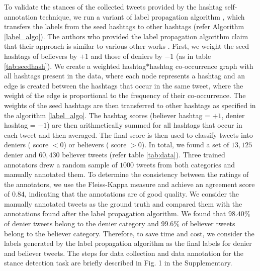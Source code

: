 \documentclass[letterpaper]{article} %
\begin{document}
To validate the stances of the collected tweets provided by the hashtag self-annotation technique, we run a variant of label propagation algorithm \cite{tyagi2020polarizing,tyagi2020computational}, which transfers the labels from the seed hashtags to other hashtags (refer Algorithm \ref{label_algo}). The authors who provided the label propagation algorithm claim that their approach is similar to various other works \cite{weber2013secular,garimella2018quantifying}. First, we weight the seed hashtags of believers by $+1$ and those of deniers by $-1$ (as in table \ref{tab:seedhash}). We create a weighted hashtag$*$hashtag co-occurrence graph with all hashtags present in the data, where each node represents a hashtag and an edge is created between the hashtags that occur in the same tweet, where the weight of the edge is proportional to the frequency of their co-occurrence. The weights of the seed hashtags are then transferred to other hashtags as specified in the algorithm \ref{label_algo}. The hashtag scores (believer hashtag = $+1$, denier hashtag = $-1$) are then arithmetically summed for all hashtags that occur in each tweet and then averaged. The final score is then used to classify tweets into deniers ( score $< 0$) or believers ( score $> 0$). In total, we found a set of $13,125$ denier and $60,430$ believer tweets (refer table \ref{tab:data}). Three trained annotators drew a random sample of $1000$ tweets from both categories and manually annotated them. To determine the consistency between the ratings of the annotators, we use the Fleiss-Kappa \cite{spitzer1967quantification} measure and achieve an agreement score of $0.84$, indicating that the annotations are of good quality. We consider the manually annotated tweets as the ground truth and compared them with the annotations found after the label propagation algorithm. We found that $98.40\%$ of denier tweets belong to the denier category and $99.6\%$ of believer tweets belong to the believer category. Therefore, to save time and cost, we consider the labels generated by the label propagation algorithm as the final labels for denier and believer tweets. The steps for data collection and data annotation for the stance detection task are briefly described in Fig. 1 in the Supplementary.

\end{document}
